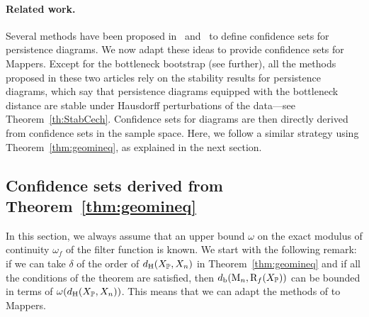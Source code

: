 \paragraph*{Related work.} Several methods have been proposed in~\cite{Fasy14} and~\cite{Chazal14b}  
to define confidence sets for persistence diagrams. We now adapt these ideas to provide confidence sets for Mappers. 
Except for the bottleneck bootstrap (see further), all the methods proposed in these two articles rely on the 
stability results for persistence diagrams, which say that persistence diagrams equipped with the bottleneck distance 
are stable under Hausdorff perturbations of the data---see Theorem~\ref{th:StabCech}. Confidence sets for diagrams are then directly 
derived from confidence sets in the sample space. Here, we follow a similar strategy using Theorem~\ref{thm:geomineq}, as explained in the next section. 


\subsection{Confidence sets derived from Theorem~\ref{thm:geomineq}}
\label{sec:confTh}

In this section, we always assume that an upper bound $\omega$ on the exact modulus of continuity $\omega_f$ of the filter function is known. 
We start with the following remark: if we can take $\delta$ of the order of $d_{\rm H}(X_{\mathbb{P}},X_n)$ in Theorem~\ref{thm:geomineq} 
and if all the conditions of the theorem are satisfied, then $d_{\rm b}(\mathrm{M}_n,\mathrm{R}_f(X_{\mathbb{P}}))$ can be bounded in terms of 
$\omega(d_{\rm H}(X_{\mathbb{P}},X_n))$.  This means that we can adapt the methods of \cite{Fasy14} to Mappers.

